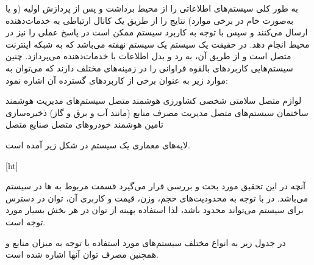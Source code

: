 
\label{فصل۲:مفاهیم اولیه}

به طور کلی سیستم‌های  اطلاعاتی را از محیط برداشت و پس از پردازش اولیه (و یا به‌صورت خام در برخی موارد) نتایج را از طریق یک کانال ارتباطی به خدمات‌دهنده ارسال می‌کنند و سپس با توجه به کاربرد سیستم ممکن است در پاسخ عملی را نیز در محیط انجام دهد. در حقیقت یک سیستم  یک سیستم نهفته می‌باشد که به شبکه اینترنت متصل است و از طریق آن، به رد و بدل اطلاعات با خدمات‌دهنده می‌پردازد. چنین سیستم‌هایی کاربردهای بالقوه فراوانی را در زمینه‌های مختلف دارند که می‌توان به موارد زیر به عنوان برخی از کاربردهای گسترده آن اشاره نمود:


 لوازم متصل سلامتی شخصی
 کشاورزی هوشمند متصل
 سیستم‌های مدیریت هوشمند ساختمان
 سیستم‌های متصل مدیریت مصرف منابع (مانند آب و برق و گاز)
 ذخیره‌سازی تامین هوشمند
 خودروهای متصل
 صنایع متصل


لایه‌های معماری یک سیستم  در شکل زیر آمده است.

[ht]



آنچه در این تحقیق مورد بحث و بررسی قرار می‌گیرد قسمت مربوط به  ها در سیستم  می‌باشد. در  با توجه به محدودیت‌های حجم، وزن، قیمت و کاربری آن، توان در دسترس برای سیستم می‌تواند محدود باشد، لذا استفاده بهینه از توان در هر بخش بسیار مورد توجه است. 


در جدول زیر به انواع مختلف سیستم‌های  مورد استفاده با توجه به میزان منابع و همچنین مصرف توان آنها اشاره شده است.


\begin{latin}
	
\end{latin}
	
	



































